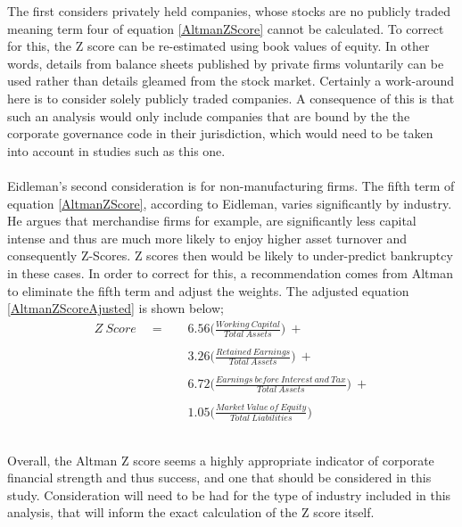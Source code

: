 {The first considers privately held companies, whose stocks are no publicly traded meaning term four of equation \ref{AltmanZScore} cannot be calculated. To correct for this, the Z score can be re-estimated using book values of equity. In other words, details from balance sheets published by private firms voluntarily can be used rather than details gleamed from the stock market. Certainly a work-around here is to consider solely publicly traded companies. A consequence of this is that such an analysis would only include companies that are bound by the the corporate governance code in their jurisdiction, which would need to be taken into account in studies such as this one.\\\\ Eidleman's second consideration is for non-manufacturing firms. The fifth term of equation \ref{AltmanZScore}, according to Eidleman, varies significantly by industry. He argues that merchandise firms for example, are significantly less capital intense and thus are much more likely to enjoy higher asset turnover and consequently Z-Scores. Z scores then would be likely to under-predict bankruptcy in these cases. In order to correct for this, a recommendation comes from Altman to eliminate the fifth term and adjust the weights. 
\clearpage
The adjusted equation \ref{AltmanZScoreAjusted} is shown below;
\begin {equation}\label{AltmanZScoreAjusted}
\begin{aligned}
Z \ Score \quad =  \quad & 6.56\bigg(\frac{Working \ Capital}{Total \ Assets}\bigg) \ + \\\\
		& 3.26\bigg({\frac{Retained \ Earnings}{Total \ Assets}}\bigg) \ + \\\\
		& 6.72\bigg({\frac{Earnings \ before \ Interest \ and \ Tax}{Total \ Assets}}\bigg) \ + \\\\
		& 1.05\bigg({\frac{Market \ Value \ of \ Equity}{Total \ Liabilities}}\bigg) \ \\\\ 
\end{aligned}
\end{equation}\\
Overall, the Altman Z score seems a highly appropriate indicator of corporate financial strength and thus success, and one that should be considered in this study. Consideration will need to be had for the type of industry included in this analysis, that will inform the exact calculation of the Z score itself. }\\\\
